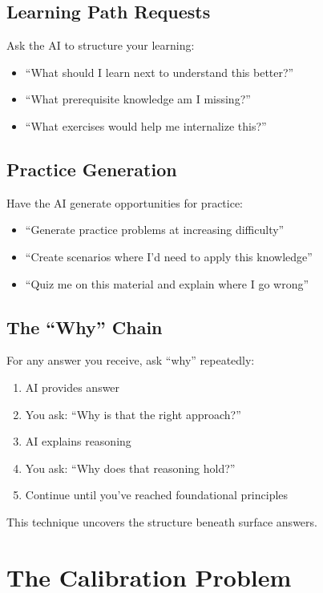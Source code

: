 \subsection{Learning Path Requests}

Ask the AI to structure your learning:

\begin{itemize}
    \item ``What should I learn next to understand this better?''
    \item ``What prerequisite knowledge am I missing?''
    \item ``What exercises would help me internalize this?''
\end{itemize}

\subsection{Practice Generation}

Have the AI generate opportunities for practice:

\begin{itemize}
    \item ``Generate practice problems at increasing difficulty''
    \item ``Create scenarios where I'd need to apply this knowledge''
    \item ``Quiz me on this material and explain where I go wrong''
\end{itemize}

\subsection{The ``Why'' Chain}

For any answer you receive, ask ``why'' repeatedly:

\begin{enumerate}
    \item AI provides answer
    \item You ask: ``Why is that the right approach?''
    \item AI explains reasoning
    \item You ask: ``Why does that reasoning hold?''
    \item Continue until you've reached foundational principles
\end{enumerate}

This technique uncovers the structure beneath surface answers.

\section{The Calibration Problem}

